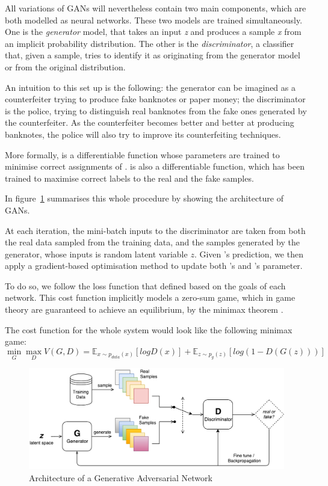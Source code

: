 All variations of GANs will nevertheless contain two main components, which are both modelled as neural networks. These two models are trained simultaneously. One is the \emph{generator} model, that takes an input \emph{z} and produces a sample \emph{x} from an implicit probability distribution. The other is the \emph{discriminator}, a classifier that, given a sample, tries to identify it as originating from the generator model or from the original distribution.

An intuition to this set up is the following: the generator  can be imagined as a counterfeiter trying to produce fake banknotes or paper money; the discriminator  is the police, trying to distinguish real banknotes from the fake ones generated by the counterfeiter. As the counterfeiter becomes better and better at producing banknotes, the police will also try to improve its counterfeiting techniques.

More formally,  is a differentiable function whose parameters are trained to minimise correct assignments of .  is also a differentiable function, which has been trained to maximise correct labels to the real and the fake samples.

In figure~\ref{fig:VanillaGAN} summarises this whole procedure by showing the architecture of GANs.

At each iteration, the mini-batch inputs to the discriminator  are taken from both the real data sampled from the training data, and the samples generated by the generator, whose inputs is random latent variable $z$. Given 's prediction, we then apply a gradient-based optimisation method to update both 's and 's parameter.

To do so, we follow the loss function that defined based on the goals of each network. This cost function implicitly models a zero-sum game, which in game theory are guaranteed to achieve an equilibrium, by the minimax theorem \citep{du2013minimax}.

The cost function for the whole system would look like the following minimax game:
\[\min_{G} \max_{D} V(G, D) = \mathbb{E}_{x\sim p_{data}(x)}[log D(x)] + \mathbb{E}_{z \sim p_{g}(z)}[log(1-D(G(z)))] \]

\begin{figure}
\centering
\includegraphics[width=15cm]{Figures/VanillaGAN}
\caption{Architecture of a Generative Adversarial Network}
\label{fig:VanillaGAN}
\end{figure}

